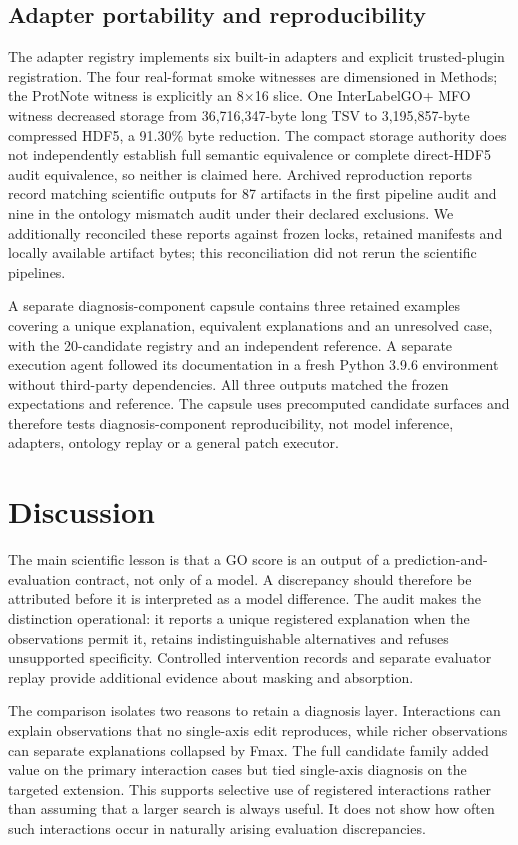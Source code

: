 \documentclass[11pt]{article}
\begin{document}
\subsection{Adapter portability and reproducibility}
The adapter registry implements six built-in adapters and explicit trusted-plugin registration. The four real-format smoke witnesses are dimensioned in Methods; the ProtNote witness is explicitly an 8$\times$16 slice. One InterLabelGO+ MFO witness decreased storage from 36,716,347-byte long TSV to 3,195,857-byte compressed HDF5, a 91.30\% byte reduction. The compact storage authority does not independently establish full semantic equivalence or complete direct-HDF5 audit equivalence, so neither is claimed here. Archived reproduction reports record matching scientific outputs for 87 artifacts in the first pipeline audit and nine in the ontology mismatch audit under their declared exclusions. We additionally reconciled these reports against frozen locks, retained manifests and locally available artifact bytes; this reconciliation did not rerun the scientific pipelines.

A separate diagnosis-component capsule contains three retained examples covering a unique explanation, equivalent explanations and an unresolved case, with the 20-candidate registry and an independent reference. A separate execution agent followed its documentation in a fresh Python 3.9.6 environment without third-party dependencies. All three outputs matched the frozen expectations and reference. The capsule uses precomputed candidate surfaces and therefore tests diagnosis-component reproducibility, not model inference, adapters, ontology replay or a general patch executor.

\section{Discussion}

The main scientific lesson is that a GO score is an output of a prediction-and-evaluation contract, not only of a model. A discrepancy should therefore be attributed before it is interpreted as a model difference. The audit makes the distinction operational: it reports a unique registered explanation when the observations permit it, retains indistinguishable alternatives and refuses unsupported specificity. Controlled intervention records and separate evaluator replay provide additional evidence about masking and absorption.

The comparison isolates two reasons to retain a diagnosis layer. Interactions can explain observations that no single-axis edit reproduces, while richer observations can separate explanations collapsed by Fmax. The full candidate family added value on the primary interaction cases but tied single-axis diagnosis on the targeted extension. This supports selective use of registered interactions rather than assuming that a larger search is always useful. It does not show how often such interactions occur in naturally arising evaluation discrepancies.
\end{document}

